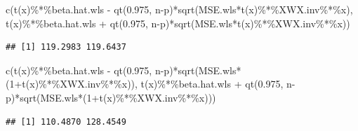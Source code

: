 \documentclass[
]{book}
\newenvironment{Shaded}{\begin{snugshade}}{\end{snugshade}}
\newcommand{\DecValTok}[1]{\textcolor[rgb]{0.00,0.00,0.81}{#1}}
\newcommand{\FloatTok}[1]{\textcolor[rgb]{0.00,0.00,0.81}{#1}}
\newcommand{\FunctionTok}[1]{\textcolor[rgb]{0.00,0.00,0.00}{#1}}
\newcommand{\NormalTok}[1]{#1}
\newcommand{\SpecialCharTok}[1]{\textcolor[rgb]{0.00,0.00,0.00}{#1}}
\begin{document}
\begin{Shaded}
\begin{Highlighting}[]
\FunctionTok{c}\NormalTok{(}\FunctionTok{t}\NormalTok{(x)}\SpecialCharTok{\%*\%}\NormalTok{beta.hat.wls }\SpecialCharTok{{-}} \FunctionTok{qt}\NormalTok{(}\FloatTok{0.975}\NormalTok{, n}\SpecialCharTok{{-}}\NormalTok{p)}\SpecialCharTok{*}\FunctionTok{sqrt}\NormalTok{(MSE.wls}\SpecialCharTok{*}\FunctionTok{t}\NormalTok{(x)}\SpecialCharTok{\%*\%}\NormalTok{XWX.inv}\SpecialCharTok{\%*\%}\NormalTok{x), }\FunctionTok{t}\NormalTok{(x)}\SpecialCharTok{\%*\%}\NormalTok{beta.hat.wls }\SpecialCharTok{+} \FunctionTok{qt}\NormalTok{(}\FloatTok{0.975}\NormalTok{, n}\SpecialCharTok{{-}}\NormalTok{p)}\SpecialCharTok{*}\FunctionTok{sqrt}\NormalTok{(MSE.wls}\SpecialCharTok{*}\FunctionTok{t}\NormalTok{(x)}\SpecialCharTok{\%*\%}\NormalTok{XWX.inv}\SpecialCharTok{\%*\%}\NormalTok{x))}
\end{Highlighting}
\end{Shaded}

\begin{verbatim}
## [1] 119.2983 119.6437
\end{verbatim}

\begin{Shaded}
\begin{Highlighting}[]
\FunctionTok{c}\NormalTok{(}\FunctionTok{t}\NormalTok{(x)}\SpecialCharTok{\%*\%}\NormalTok{beta.hat.wls }\SpecialCharTok{{-}} \FunctionTok{qt}\NormalTok{(}\FloatTok{0.975}\NormalTok{, n}\SpecialCharTok{{-}}\NormalTok{p)}\SpecialCharTok{*}\FunctionTok{sqrt}\NormalTok{(MSE.wls}\SpecialCharTok{*}\NormalTok{(}\DecValTok{1}\SpecialCharTok{+}\FunctionTok{t}\NormalTok{(x)}\SpecialCharTok{\%*\%}\NormalTok{XWX.inv}\SpecialCharTok{\%*\%}\NormalTok{x)), }\FunctionTok{t}\NormalTok{(x)}\SpecialCharTok{\%*\%}\NormalTok{beta.hat.wls }\SpecialCharTok{+} \FunctionTok{qt}\NormalTok{(}\FloatTok{0.975}\NormalTok{, n}\SpecialCharTok{{-}}\NormalTok{p)}\SpecialCharTok{*}\FunctionTok{sqrt}\NormalTok{(MSE.wls}\SpecialCharTok{*}\NormalTok{(}\DecValTok{1}\SpecialCharTok{+}\FunctionTok{t}\NormalTok{(x)}\SpecialCharTok{\%*\%}\NormalTok{XWX.inv}\SpecialCharTok{\%*\%}\NormalTok{x)))}
\end{Highlighting}
\end{Shaded}

\begin{verbatim}
## [1] 110.4870 128.4549
\end{verbatim}
\end{document}
